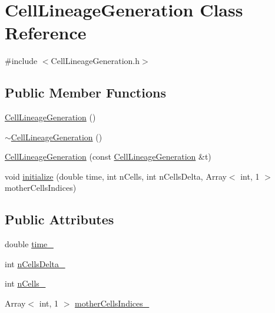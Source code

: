 \hypertarget{class_cell_lineage_generation}{\section{\-Cell\-Lineage\-Generation \-Class \-Reference}
\label{class_cell_lineage_generation}
}


{\ttfamily \#include $<$\-Cell\-Lineage\-Generation.\-h$>$}

\subsection*{\-Public \-Member \-Functions}
\begin{DoxyCompactItemize}
\item 
\hyperlink{class_cell_lineage_generation_afd1bcd2890e6c8241369db29126e767c}{\-Cell\-Lineage\-Generation} ()
\item 
\hyperlink{class_cell_lineage_generation_a31940f9888f93979272680fdd782ed6a}{$\sim$\-Cell\-Lineage\-Generation} ()
\item 
\hyperlink{class_cell_lineage_generation_ac6da7f34945d8bed83593bdd115490fd}{\-Cell\-Lineage\-Generation} (const \hyperlink{class_cell_lineage_generation}{\-Cell\-Lineage\-Generation} \&t)
\item 
void \hyperlink{class_cell_lineage_generation_a8ab621b6c89986fe9a9dced36322804e}{initialize} (double time, int n\-Cells, int n\-Cells\-Delta, \-Array$<$ int, 1 $>$ mother\-Cells\-Indices)
\end{DoxyCompactItemize}
\subsection*{\-Public \-Attributes}
\begin{DoxyCompactItemize}
\item 
double \hyperlink{class_cell_lineage_generation_a49b7013584bc82fd66cc1e3f9e768c71}{time\-\_\-}
\item 
int \hyperlink{class_cell_lineage_generation_a046245349fd814cd7b5fc57d2a9d3fff}{n\-Cells\-Delta\-\_\-}
\item 
int \hyperlink{class_cell_lineage_generation_a5ba370d3f6492d43ceeb2f73e7a2c47a}{n\-Cells\-\_\-}
\item 
\-Array$<$ int, 1 $>$ \hyperlink{class_cell_lineage_generation_aea150bc5abc381a0a7df890ece98543f}{mother\-Cells\-Indices\-\_\-}
\end{DoxyCompactItemize}


